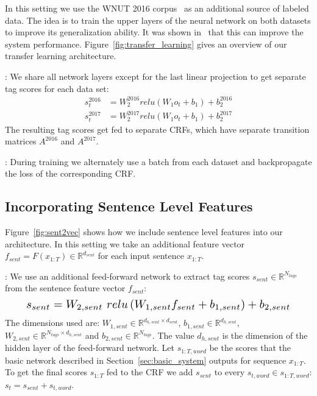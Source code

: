 \documentclass[11pt,letterpaper]{article}
\begin{document}
In this setting we use the WNUT 2016 corpus~\cite{wnut2016} as an additional
source of labeled data. The idea is to train the upper layers of the neural
network on both datasets to improve its generalization ability. It was shown
in~\cite{transfer_learning} that this can improve the system performance.
Figure~\ref{fig:transfer_learning} gives an overview of our transfer learning
architecture.

: We share all network layers except for the
last linear projection to get separate tag scores for each data set:
\begin{equation}
\begin{aligned}
    s_{t}^{2016} &= W_{2}^{2016}relu(W_{1}o_{t} + b_{1}) + b_{2}^{2016} \\
    s_{t}^{2017} &= W_{2}^{2017}relu(W_{1}o_{t} + b_{1}) + b_{2}^{2017}
\end{aligned}
\end{equation}
The resulting tag scores get fed to separate CRFs, which have separate transition
matrices $A^{2016}$ and $A^{2017}$.

: During training we alternately use a batch from
each dataset and backpropagate the loss of the corresponding CRF\@.

\subsection{Incorporating Sentence Level Features}
\label{sec:sent2vec}

Figure~\ref{fig:sent2vec} shows how we include sentence level features into our
architecture. In this setting we take an additional feature vector
$f_{sent} = F\left(x_{1:T}\right) \in \mathbb{R}^{d_{sent}}$ for each input
sentence $x_{1:T}$.

: We use an additional feed-forward network
to extract tag scores $s_{sent} \in \mathbb{R}^{N_{tags}}$ from the sentence
feature vector $f_{sent}$:
\[
    \resizebox{0.9\hsize}{!}{$s_{sent} = W_{2, sent}\ relu\left(W_{1, sent}f_{sent}
    + b_{1, sent}\right) + b_{2, sent}$}
\]
The dimensions used are: $W_{1, sent} \in \mathbb{R}^{d_{h, sent} \times d_{sent}}$,
$b_{1, sent} \in \mathbb{R}^{d_{h, sent}}$, $W_{2, sent} \in \mathbb{R}^{N_{tags} \times d_{h, sent}}$
and $b_{2, sent} \in \mathbb{R}^{N_{tags}}$. The value $d_{h, sent}$ is the dimension
of the hidden layer of the feed-forward network.
Let $s_{1:T, word}$ be the scores that the basic network described in
Section~\ref{sec:basic_system} outputs for sequence $x_{1:T}$. To get the final
scores $s_{1:T}$ fed to the CRF we add $s_{sent}$ to every
$s_{t, word} \in s_{1:T, word}$: $s_{t} = s_{sent} + s_{t, word}$.
\end{document}
